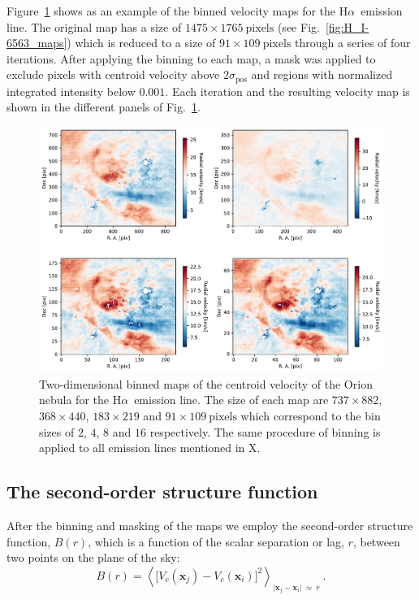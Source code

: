 \documentclass[fleqn,usenatbib, useAMS, a4paper]{mnras}
\newcommand\halpha{H${\alpha}$}
\newcommand\xx{\ensuremath{\boldsymbol{x}}}
\begin{document}
Figure~\ref{fig:figures/Ha_maps_comparison} shows as an example of the binned velocity maps for the \halpha\ emission line.
The original map has a size of \(1 475 \times1765 \ \text{pixels}\) (see Fig.~\ref{fig:H_I-6563_maps}) which is reduced to a size of \(91 \times 109 \ \text{pixels}\) through a series of four iterations.
After applying the binning to each map, a mask was applied to exclude pixels with centroid velocity above \(2\sigma_\text{pos}\) and regions with normalized integrated intensity below \(0.001\).
Each iteration and the resulting velocity map is shown in the different panels of Fig.~\ref{fig:figures/Ha_maps_comparison}.

\begin{figure}
 \centering
 \includegraphics[width=6.5in]{figures/Ha_maps_comparison.pdf}\par
 \caption{
 Two-dimensional binned maps of the centroid velocity of the Orion nebula for the \halpha\ emission line. The size of each map are \(737 \times 882\), \(368\times 440\), \(183 \times 219\)  and \(91 \times 109 \ \text{pixels}\) which correspond to the bin sizes of $2$, $4$, $8$ and $16$ respectively. The same procedure of binning is applied to all emission lines mentioned in X.  
 }
\label{fig:figures/Ha_maps_comparison}
\end{figure}

\subsection{The second-order structure function}
\label{sec:second-order-struct}

After the binning and masking of the maps we employ the second-order structure function, $B(r)$, which is a function of the scalar separation or lag, \(r\),
between two points on the plane of the sky:
%
\newcommand\Abs[1]{\vert #1\vert}
\begin{equation}\label{eq:Br}
  B(r) = \left\langle 
  \bigl[
  V_{c}(\xx_j) - V_{c}(\xx_i)
  \bigr]^{2} \right \rangle_{\Abs{\xx_j - \xx_i\!} \ \approx \ r} \ .
\end{equation}
\end{document}
